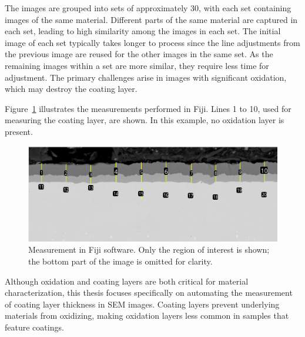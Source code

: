 The images are grouped into sets of approximately 30, with each set containing images of the same material. Different parts of the same material are captured in each set, leading to high similarity among the images in each set. The initial image of each set typically takes longer to process since the line adjustments from the previous image are reused for the other images in the same set. As the remaining images within a set are more similar, they require less time for adjustment. The primary challenges arise in images with significant oxidation, which may destroy the coating layer.

Figure~\ref{fig:Fiji} illustrates the measurements performed in Fiji. Lines 1 to 10, used for measuring the coating layer, are shown. In this example, no oxidation layer is present.

\begin{figure}[H]
    \centering
    \includegraphics[width=0.7\linewidth]{PICTURES/fiji_small.png}
    \caption{Measurement in Fiji software. Only the region of interest is shown; the bottom part of the image is omitted for clarity.}
    
    \label{fig:Fiji}
\end{figure}


Although oxidation and coating layers are both critical for material characterization, this thesis focuses specifically on automating the measurement of coating layer thickness in SEM images. Coating layers prevent underlying materials from oxidizing, making oxidation layers less common in samples that feature coatings.

